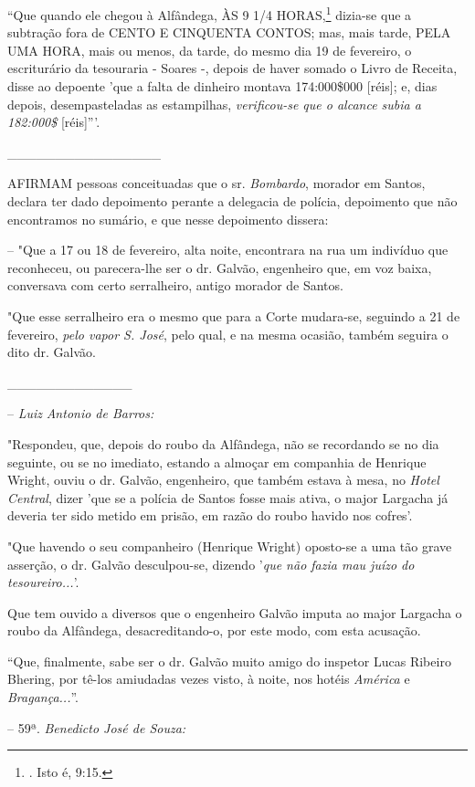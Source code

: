 ``Que quando ele chegou à Alfândega, ÀS 9 1/4 HORAS,\footnote{. Isto é,
  9:15.} dizia-se que a subtração fora de CENTO E CINQUENTA CONTOS; mas,
mais tarde, PELA UMA HORA, mais ou menos, da tarde, do mesmo dia 19 de
fevereiro, o escriturário da tesouraria - Soares -, depois de haver
somado o Livro de Receita, disse ao depoente 'que a falta de dinheiro
montava 174:000\$000 {[}réis{]}; e, dias depois, desempasteladas as
estampilhas, \emph{verificou-se que o alcance subia a 182:000\$}
{[}réis{]}'''.

\_\_\_\_\_\_\_\_\_\_\_\_\_\_\_\_

AFIRMAM pessoas conceituadas que o sr. \emph{Bombardo}, morador em
Santos, declara ter dado depoimento perante a delegacia de polícia,
depoimento que não encontramos no sumário, e que nesse depoimento
dissera:

-- "Que a 17 ou 18 de fevereiro, alta noite, encontrara na rua um
indivíduo que reconheceu, ou parecera-lhe ser o dr. Galvão, engenheiro
que, em voz baixa, conversava com certo serralheiro, antigo morador de
Santos.

"Que esse serralheiro era o mesmo que para a Corte mudara-se, seguindo a
21 de fevereiro, \emph{pelo vapor S. José}, pelo qual, e na mesma
ocasião, também seguira o dito dr. Galvão.

\_\_\_\_\_\_\_\_\_\_\_\_\_

-- \emph{Luiz} \emph{Antonio de Barros:}

"Respondeu, que, depois do roubo da Alfândega, não se recordando se no
dia seguinte, ou se no imediato, estando a almoçar em companhia de
Henrique Wright, ouviu o dr. Galvão, engenheiro, que também estava à
mesa, no \emph{Hotel Central}, dizer 'que se a polícia de Santos fosse
mais ativa, o major Largacha já deveria ter sido metido em prisão, em
razão do roubo havido nos cofres'.

"Que havendo o seu companheiro (Henrique Wright) oposto-se a uma tão
grave asserção, o dr. Galvão desculpou-se, dizendo '\emph{que não fazia
mau juízo do tesoureiro...}'.

Que tem ouvido a diversos que o engenheiro Galvão imputa ao major
Largacha o roubo da Alfândega, desacreditando-o, por este modo, com esta
acusação.

``Que, finalmente, sabe ser o dr. Galvão muito amigo do inspetor Lucas
Ribeiro Bhering, por tê-los amiudadas vezes visto, à noite, nos hotéis
\emph{América} e \emph{Bragança...}''.

-- 59ª. \emph{Benedicto José de Souza:}


